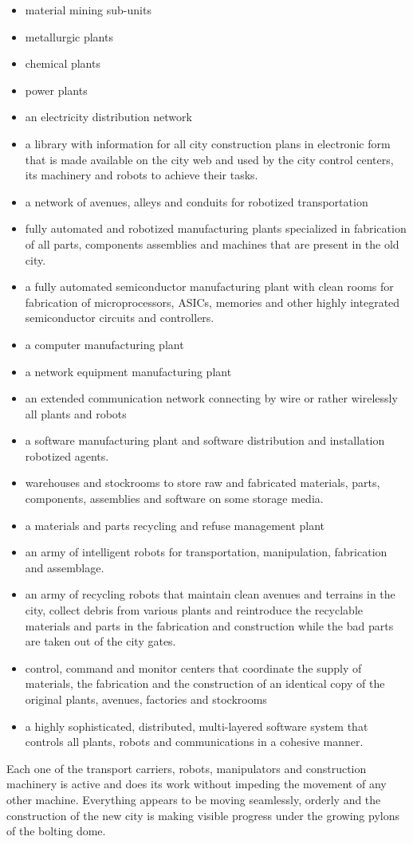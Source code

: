 \documentclass[letterpaper]{article}
\begin{document}
\begin{itemize}
\item material mining sub-units 
\item metallurgic plants
\item chemical plants
\item power plants
\item an electricity distribution network
\item a library with information for all city construction plans in
electronic form that is made available on the city web and used by the
city control centers, its machinery and robots to achieve their tasks. 
\item a network of avenues, alleys and conduits for robotized
transportation
\item fully automated and robotized manufacturing plants specialized in
fabrication of all parts, components assemblies and machines that are
present in the old city.
\item a fully automated semiconductor manufacturing plant with clean
rooms for fabrication of microprocessors, ASICs, memories and other
highly integrated semiconductor circuits and controllers.
\item a computer manufacturing plant
\item a network equipment manufacturing plant
\item an extended communication network connecting by wire or rather
wirelessly all plants and robots
\item a software manufacturing plant and software distribution and
installation robotized agents.
\item warehouses and stockrooms to store raw and fabricated materials,
parts, components, assemblies and software on some storage media.
\item a materials and parts recycling and refuse management plant
\item an army of intelligent robots for transportation, manipulation,
fabrication and assemblage.
\item an army of recycling robots that maintain clean avenues and
terrains in the city, collect debris from various plants and
reintroduce the recyclable materials and parts in the fabrication and
construction while the bad parts are taken out of the city gates.
\item control, command and monitor centers that coordinate the supply of
materials, the fabrication and the construction of an identical copy of
the original plants, avenues, factories and stockrooms
\item a highly sophisticated, distributed, multi-layered software system
that controls all plants, robots and communications in a cohesive
manner.
\end{itemize}
Each one of the transport carriers, robots, manipulators and
construction machinery is active and does its work without impeding the
movement of any other machine. Everything appears to be moving
seamlessly, orderly and the construction of the new city is making
visible progress under the growing pylons of the bolting dome.
\end{document}
